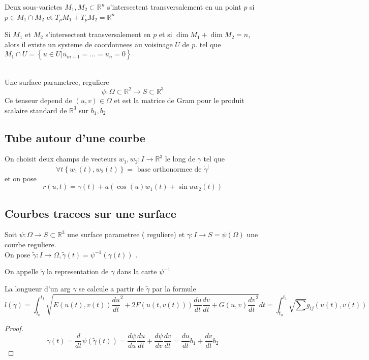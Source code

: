 \documentclass[../main.tex]{subfiles}
\begin{document}
\begin{defn}
	Deux sous-varietes $M_1,M_2 \subset \mathbb{R}^n$ s'intersectent transversalement en un point $p$ si $p\in M_1\cap M_2$ et $T_pM_1+T_p M_2= \mathbb{R}^n$ 	
\end{defn}
\begin{propo}
Si $M_1$ et $M_2$ s'intersectent transversalement en $p$ et si $\dim M_1 + \dim M_2= n$, alors il existe un systeme de coordonnees au voisinage $U$ de $p$. tel que $M_1\cap U = \left\{ u\in U | u_{m+1} = \ldots = u_n =0 \right\} $ 	
\end{propo}
\hr\\
Une surface parametree, reguliere
\[ 
\psi: \Omega \subset  \mathbb{R}^{2}\to S \subset \mathbb{R}^{3}
\]
Ce tenseur depend de $( u,v) \in \Omega$ et est la matrice de Gram pour le produit scalaire standard de $ \mathbb{R}^{3}$ sur $ b_1, b_2$ 	
\subsection*{Tube autour d'une courbe}
On choisit deux champs de vecteurs $w_1, w_2: I\to \mathbb{R}^{3}$ le long de $\gamma$ tel que
\[ 
\forall t \left\{ w_1( t) , w_2( t)  \right\} = \text{ base orthonormee de  } \dot \gamma ^{\vert}
\]
et on pose 
\[ 
r( u,t) = \gamma( t) + a ( \cos ( u) w_1( t) + \sin u w_2( t)  ) 
\]
\subsection{Courbes tracees sur une surface}
Soit $\psi: \Omega\to S \subset \mathbb{R}^{3}$ une surface parametree ( reguliere) et $\gamma: I \to S= \psi( \Omega) $ une courbe reguliere.\\
On pose $\tilde\gamma: I \to \Omega, \tilde\gamma( t) = \psi^{-1}( \gamma( t) ) $ .\\
\begin{defn}
	On appelle $\tilde\gamma$ la representation de $\gamma$ dans la carte $\psi^{-1}$ 
\end{defn}
\begin{propo}
La longueur d'un arg $\gamma$ se calcule a partir de $\tilde\gamma$ par la formule
\[ 
l( \gamma) = \int_{ t_0 }^{ t_1 } \sqrt{ E( u( t) ,v( t) ) \frac{du}{dt}^{2} + 2 F( u( t,v( t) ) ) \frac{du}{dt}\frac{dv}{dt}+ G( u,v) \frac{dv}{dt}^{2}	 } dt= \int_{ t_0 }^{ t_1 }\sqrt{ \sum} g_{ij} ( u( t) ,v( t) ) 
\]

\end{propo}
\begin{proof}
\[ 
\dot\gamma( t) = \frac{d}{dt}\psi( \tilde\gamma( t) ) = \frac{d\psi}{du} \frac{du}{dt}+ \frac{d\psi}{dv}\frac{dv}{dt}= \frac{du}{dt}b_1 + \frac{dv}{dt}b_2
\]

\end{proof}
\end{document}
